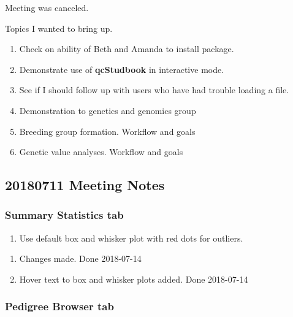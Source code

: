 \documentclass[
]{article}
\providecommand{\tightlist}{%
  \setlength{\itemsep}{0pt}\setlength{\parskip}{0pt}}
\begin{document}
Meeting was canceled.

Topics I wanted to bring up.

\begin{enumerate}
\def\labelenumi{\arabic{enumi}.}
\tightlist
\item
  Check on ability of Beth and Amanda to install package.
\item
  Demonstrate use of \textbf{qcStudbook} in interactive mode.
\item
  See if I should follow up with users who have had trouble loading a
  file.
\item
  Demonstration to genetics and genomics group
\item
  Breeding group formation. Workflow and goals
\item
  Genetic value analyses. Workflow and goals
\end{enumerate}

\hypertarget{meeting-notes}{%
\subsection{20180711 Meeting Notes}\label{meeting-notes}}

\hypertarget{summary-statistics-tab}{%
\subsubsection{Summary Statistics tab}\label{summary-statistics-tab}}

\begin{enumerate}
\def\labelenumi{\arabic{enumi}.}
\tightlist
\item
  Use default box and whisker plot with red dots for outliers.
\end{enumerate}

\begin{enumerate}
\def\labelenumi{\alph{enumi}.}
\tightlist
\item
  Changes made. Done 2018-07-14
\item
  Hover text to box and whisker plots added. Done 2018-07-14
\end{enumerate}

\hypertarget{pedigree-browser-tab}{%
\subsubsection{Pedigree Browser tab}\label{pedigree-browser-tab}}
\end{document}
